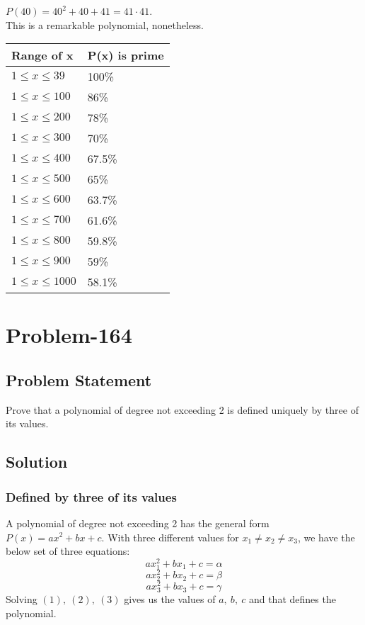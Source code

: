 \documentclass[12pt]{article}
\begin{document}
$P(40) = 40^2+40+41 = 41 \cdot 41$.
\\

This is a remarkable polynomial, nonetheless.
\begin{table}[h!]
  \begin{center}
    \begin{tabular}{l|l}
      \textbf{Range of x} & \textbf{P(x) is prime}\\
      \hline
      $1 \leq x \leq 39$ & 100\%\\
      $1 \leq x \leq 100$ & 86\%\\
      $1 \leq x \leq 200$ & 78\%\\
      $1 \leq x \leq 300$ & 70\%\\
      $1 \leq x \leq 400$ & 67.5\%\\
      $1 \leq x \leq 500$ & 65\%\\
      $1 \leq x \leq 600$ & 63.7\%\\
      $1 \leq x \leq 700$ & 61.6\%\\
      $1 \leq x \leq 800$ & 59.8\%\\
      $1 \leq x \leq 900$ & 59\%\\
      $1 \leq x \leq 1000$ & 58.1\%\\
    \end{tabular}
  \end{center}
\end{table}

\section*{Problem-164}
\subsection*{Problem Statement}
Prove that a polynomial of degree not exceeding 2 is defined uniquely by three of its values.

\subsection*{Solution}
\subsubsection*{Defined by three of its values}
A polynomial of degree not exceeding 2 has the general form $P(x) = ax^2 + bx+c$. With three different values for $x_1 \neq x_2 \neq x_3$, we have the below set of three equations:
\setcounter{equation}{0}
\begin{equation}
ax_1^2 + bx_1 + c = \alpha
\end{equation}
\begin{equation}
ax_2^2 + bx_2 + c = \beta
\end{equation}
\begin{equation}
ax_3^2 + bx_3 + c = \gamma
\end{equation}
Solving $(1),\ (2),\ (3)$ gives us the values of $a,\ b,\ c$ and that defines the polynomial.
\end{document}
